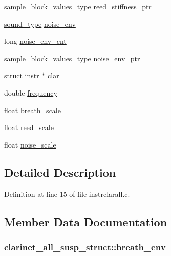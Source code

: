 \begin{DoxyCompactItemize}
\item 
\hyperlink{sound_8h_a83d17f7b465d1591f27cd28fc5eb8a03}{sample\+\_\+block\+\_\+values\+\_\+type} \hyperlink{structclarinet__all__susp__struct_a1ef4f42fbce5563453dbb23e99cbe515}{reed\+\_\+stiffness\+\_\+ptr}
\item 
\hyperlink{sound_8h_a792cec4ed9d6d636d342d9365ba265ea}{sound\+\_\+type} \hyperlink{structclarinet__all__susp__struct_ad4d045528b15cb389d773b2a3ce8c8dd}{noise\+\_\+env}
\item 
long \hyperlink{structclarinet__all__susp__struct_a4cb93c9dd4ba4d0fe8abfbe6dba8ca82}{noise\+\_\+env\+\_\+cnt}
\item 
\hyperlink{sound_8h_a83d17f7b465d1591f27cd28fc5eb8a03}{sample\+\_\+block\+\_\+values\+\_\+type} \hyperlink{structclarinet__all__susp__struct_a4ac2ec139605d426618d38c74eb01adb}{noise\+\_\+env\+\_\+ptr}
\item 
struct \hyperlink{structinstr}{instr} $\ast$ \hyperlink{structclarinet__all__susp__struct_a14a4f024e66a970d1ee9740505b037bf}{clar}
\item 
double \hyperlink{structclarinet__all__susp__struct_a0e12f3298c070b23fef377977aee3d0d}{frequency}
\item 
float \hyperlink{structclarinet__all__susp__struct_a31b80eb32132bd85a75a4f5fcb1726e7}{breath\+\_\+scale}
\item 
float \hyperlink{structclarinet__all__susp__struct_a8089a29b1fe0f046453af3d93dff562a}{reed\+\_\+scale}
\item 
float \hyperlink{structclarinet__all__susp__struct_aca18f71156cf3f9d31d29ed86183428c}{noise\+\_\+scale}
\end{DoxyCompactItemize}


\subsection{Detailed Description}


Definition at line 15 of file instrclarall.\+c.



\subsection{Member Data Documentation}
\subsubsection[{\texorpdfstring{breath\+\_\+env}{breath_env}}]{ clarinet\+\_\+all\+\_\+susp\+\_\+struct\+::breath\+\_\+env}\hypertarget{structclarinet__all__susp__struct_a2251679dec431528190f8595369dd2a7}{}\label{structclarinet__all__susp__struct_a2251679dec431528190f8595369dd2a7}


